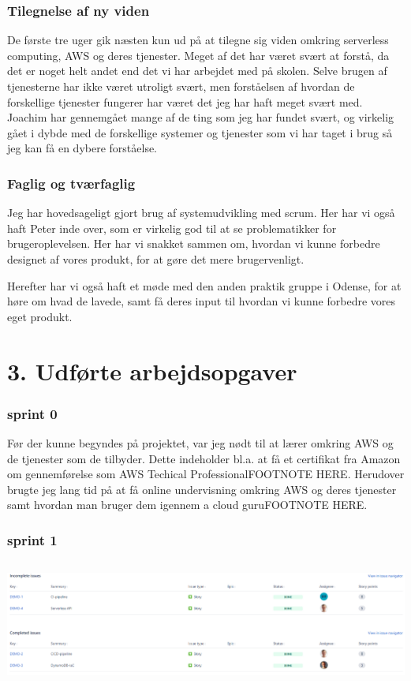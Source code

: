 \documentclass[11pt]{report}
\begin{document}
\subsection*{Tilegnelse af ny viden}
De første tre uger gik næsten kun ud på at tilegne sig viden omkring serverless computing, 
AWS og deres tjenester. Meget af det har været svært at forstå, da det er noget helt andet 
end det vi har arbejdet med på skolen. Selve brugen af tjenesterne har ikke været utroligt svært, 
men forståelsen af hvordan de forskellige tjenester fungerer har været det jeg har haft meget svært med. 
Joachim har gennemgået mange af de ting som jeg har fundet svært, og virkelig gået i dybde med de forskellige 
systemer og tjenester som vi har taget i brug så jeg kan få en dybere forståelse. 

\subsection*{Faglig og tværfaglig}
Jeg har hovedsageligt gjort brug af systemudvikling med scrum. 
Her har vi også haft Peter inde over, som er virkelig god til at se problematikker for brugeroplevelsen. 
Her har vi snakket sammen om, hvordan vi kunne forbedre designet af vores produkt, for at gøre det mere brugervenligt. 

Herefter har vi også haft et møde med den anden praktik gruppe i Odense, 
for at høre om hvad de lavede, samt få deres input til hvordan vi kunne forbedre vores eget produkt.


\chapter*{3. Udførte arbejdsopgaver}
\subsection*{sprint 0}
Før der kunne begyndes på projektet, var jeg nødt til at lærer omkring AWS og de tjenester som de tilbyder. 
Dette indeholder bl.a. at få et certifikat fra Amazon om gennemførelse som AWS Techical ProfessionalFOOTNOTE HERE. 
Herudover brugte jeg lang tid på at få online undervisning omkring AWS og deres tjenester samt hvordan man bruger dem igennem a cloud guruFOOTNOTE HERE.

\subsection*{sprint 1}
\begin{center} 
\includegraphics[height=4.13cm, width=15.92cm]{sprint1}
\end{center}
\end{document}
